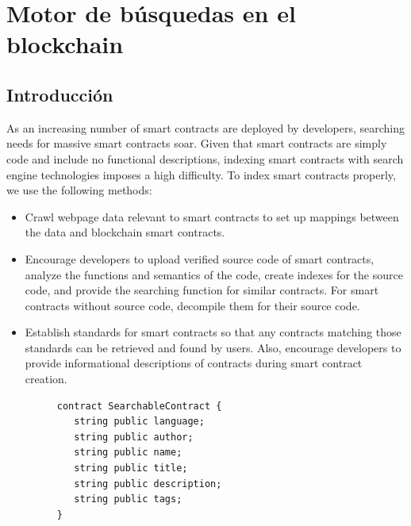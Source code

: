 \section{Motor de búsquedas en el blockchain}
\label{sec:search}

\subsection{Introducción}

As an increasing number of smart contracts are deployed by developers, searching needs for massive smart contracts soar. Given that smart contracts are simply code and include no functional descriptions, indexing smart contracts with search engine technologies imposes a high difficulty. To index smart contracts properly, we use the following methods:

\begin{itemize}
	\item Crawl webpage data relevant to smart contracts to set up mappings between the data and blockchain smart contracts.

	\item Encourage developers to upload verified source code of smart contracts, analyze the functions and semantics of the code, create indexes for the source code, and provide the searching function for similar contracts. For smart contracts without source code, decompile them for their source code.

	\item Establish standards for smart contracts so that any contracts matching those standards can be retrieved and found by users. Also, encourage developers to provide informational descriptions of contracts during smart contract creation. \\

	\begin{figure}[ht]
  	\centering
  	\begin{minipage}{.4\linewidth}
	\begin{lstlisting}[frame=single]
contract SearchableContract {
   string public language;
   string public author;
   string public name;
   string public title;
   string public description;
   string public tags;
}
	\end{lstlisting}
  	\end{minipage}
	\end{figure}

\end{itemize}

